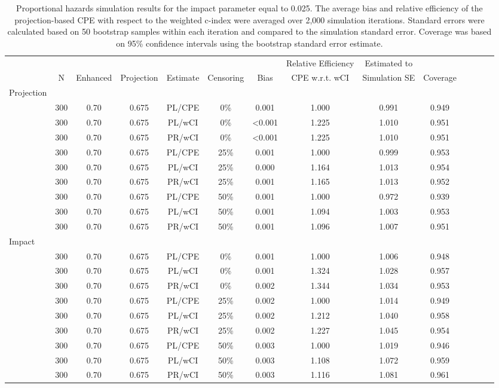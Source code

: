 \documentclass[12pt]{article}
\begin{document}
 \begin{table}[ht]
 \caption{Proportional hazards simulation results for the impact parameter equal to 0.025.
  The average bias and relative efficiency of the projection-based CPE with respect to the weighted c-index were averaged over 2,000 simulation iterations. Standard errors were calculated based on 50 bootstrap samples within each iteration and compared to the simulation standard error. Coverage was based on 95\% confidence intervals using the bootstrap standard error estimate. }
\centering
\tiny
\begin{tabular}{lccccccccccccc} \label{PHsimresultsDelta0025}
\vspace{-0.25cm}
   &&&&&& & Relative Efficiency  & Estimated to  &\\
& N & Enhanced &  Projection & Estimate & Censoring &Bias & CPE w.r.t. wCI & Simulation SE & Coverage \\
 \hline
 \hline
  Projection &&&&&&&&& \\
& 300 &0.70 & 0.675 & PL/CPE & 0\% &  0.001 & 1.000 & 0.991 & 0.949 \\  
& 300 &0.70 & 0.675 & PL/wCI &0\%  &  <0.001 & 1.225 & 1.010 & 0.951 \\
& 300 &0.70 & 0.675 & PR/wCI &0\%  &  <0.001 & 1.225 & 1.010 & 0.951 \\ 
\hline
& 300 &0.70 & 0.675 & PL/CPE  &25\% &   0.001 & 1.000 & 0.999 & 0.953 \\ 
& 300 &0.70 & 0.675 & PL/wCI &25\%  &  0.000 & 1.164 & 1.013 & 0.954 \\ 
& 300 &0.70 & 0.675 & PR/wCI &25\%  &   0.001 & 1.165 & 1.013 & 0.952 \\ 
\hline
& 300 &0.70 & 0.675 & PL/CPE  &50\%  &  0.001 & 1.000 & 0.972 & 0.939 \\ 
& 300 &0.70 & 0.675 & PL/wCI &50\%  &   0.001 & 1.094 & 1.003 & 0.953 \\
& 300 &0.70 & 0.675 & PR/wCI &50\%  &  0.001 & 1.096 & 1.007 & 0.951 \\ 
  \hline
  \hline
  Impact &&&&&&&&& \\
& 300 &0.70 & 0.675 & PL/CPE   &0\%  &  0.001 & 1.000 & 1.006 & 0.948 \\ 
& 300 &0.70 & 0.675 & PL/wCI &0\%  &   0.001 & 1.324 & 1.028 & 0.957 \\ 
& 300 &0.70 & 0.675 & PR/wCI &0\%  &   0.002 & 1.344 & 1.034 & 0.953 \\ 
\hline
&   300 &0.70 & 0.675 & PL/CPE   &25\% & 0.002 & 1.000 & 1.014 & 0.949 \\ 
& 300 &0.70 & 0.675 & PL/wCI &25\%  &  0.002 & 1.212 & 1.040 & 0.958 \\ 
& 300 &0.70 & 0.675 & PR/wCI &25\%  &  0.002 & 1.227 & 1.045 & 0.954 \\ 
\hline
& 300 &0.70 & 0.675 & PL/CPE   &50\%  & 0.003 & 1.000 & 1.019 & 0.946 \\ 
& 300 &0.70 & 0.675 & PL/wCI &50\% & 0.003 & 1.108 & 1.072 & 0.959 \\
& 300 &0.70 & 0.675 & PR/wCI &50\% &   0.003 & 1.116 & 1.081 & 0.961 \\
  \hline
  \hline
\end{tabular}
\end{table}
\end{document}
